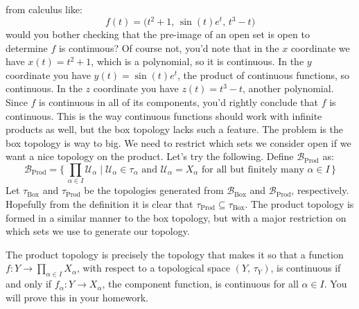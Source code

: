 \documentclass{article}
\theoremstyle{plain}
\theoremstyle{normal}
\begin{document}
        from calculus like:
        \begin{equation}
            f(t)=\big(t^{2}+1,\,\sin(t)e^{t},\,t^{3}-t\big)
        \end{equation}
        would you bother checking that the pre-image of an open set is open
        to determine $f$ is continuous? Of course not, you'd note that in
        the $x$ coordinate we have $x(t)=t^{2}+1$, which is a polynomial, so
        it is continuous. In the $y$ coordinate you have
        $y(t)=\sin(t)e^{t}$, the product of continuous functions, so continuous.
        In the $z$ coordinate you have $z(t)=t^{3}-t$, another polynomial.
        Since $f$ is continuous in all of its components, you'd rightly
        conclude that $f$ is continuous. This is the way continuous functions
        should work with infinite products as well, but the box topology
        lacks such a feature. The problem is the box topology is way to big.
        We need to restrict which sets we consider open if we want a nice
        topology on the product. Let's try the following.
        Define $\mathcal{B}_{\textrm{Prod}}$ as:
        \begin{equation}
            \mathcal{B}_{\textrm{Prod}}
            =\Big\{\,\prod_{\alpha\in{I}}\mathcal{U}_{\alpha}\;|\;
                \mathcal{U}_{\alpha}\in\tau_{\alpha}\textrm{ and }
                \mathcal{U}_{\alpha}=X_{\alpha}
                \textrm{ for all but finitely many }
                \alpha\in{I}\,\Big\}
        \end{equation}
        Let $\tau_{\textrm{Box}}$ and $\tau_{\textrm{Prod}}$ be the
        topologies generated from $\mathcal{B}_{\textrm{Box}}$ and
        $\mathcal{B}_{\textrm{Prod}}$, respectively. Hopefully from the
        definition it is
        clear that $\tau_{\textrm{Prod}}\subseteq\tau_{\textrm{Box}}$. The
        product topology is formed in a similar manner to the box topology, but
        with a major restriction on which sets we use to generate our
        topology.
        \par\hfill\par
        The product topology is precisely the topology that makes it so that
        a function $f:Y\rightarrow\prod_{\alpha\in{I}}X_{\alpha}$,
        with respect to a topological space $(Y,\,\tau_{Y})$, is continuous
        if and only if $f_{\alpha}:Y\rightarrow{X}_{\alpha}$, the component
        function, is continuous for all $\alpha\in{I}$. You will prove this
        in your homework.
        \par\hfill\par
\end{document}
